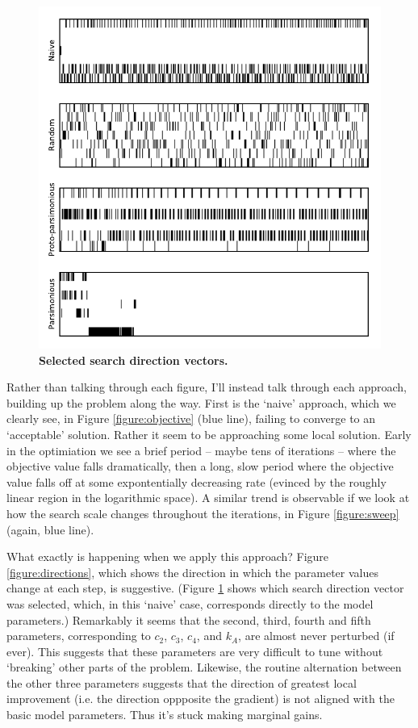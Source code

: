 \documentclass{article}
\begin{document}
\begin{figure}[!ht]
\centering
\includegraphics{seed25/figure4-direction_vectors}
\caption{\textbf{Selected search direction vectors.}}
\label{figure:direction-vectors}
\end{figure}

Rather than talking through each figure, I'll instead talk through each approach, building up the problem along the way.  First is the `naive' approach, which we clearly see, in Figure \ref{figure:objective} (blue line), failing to converge to an `acceptable' solution.  Rather it seem to be approaching some local solution.  Early in the optimiation we see a brief period -- maybe tens of iterations -- where the objective value falls dramatically, then a long, slow period where the objective value falls off at some expontentially decreasing rate (evinced by the roughly linear region in the logarithmic space).  A similar trend is observable if we look at how the search scale changes throughout the iterations, in Figure \ref{figure:sweep} (again, blue line).

What exactly is happening when we apply this approach?  Figure \ref{figure:directions}, which shows the direction in which the parameter values change at each step, is suggestive.  (Figure \ref{figure:direction-vectors} shows which search direction vector was selected, which, in this `naive' case, corresponds directly to the model parameters.)  Remarkably it seems that the second, third, fourth and fifth parameters, corresponding to \(c_2\), \(c_3\), \(c_4\), and \(k_A\), are almost never perturbed (if ever).  This suggests that these parameters are very difficult to tune without `breaking' other parts of the problem.  Likewise, the routine alternation between the other three parameters suggests that the direction of greatest local improvement (i.e. the direction oppposite the gradient) is not aligned with the basic model parameters.  Thus it's stuck making marginal gains.
\end{document}
